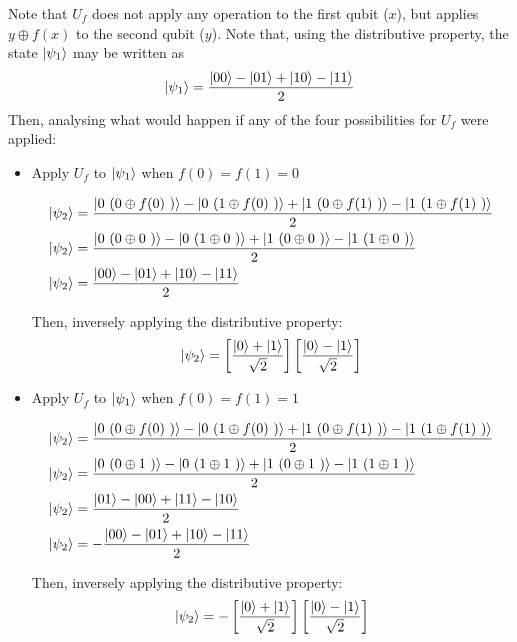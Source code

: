 Note that \(U_f\) does not apply any operation to the first qubit (\(x\)), but applies \(y \oplus f(x)\) to the second qubit (\(y\)). Note that, using the distributive property, the state \(\ket{\psi_1}\) may be written as
\[\ket{\psi_1} = \frac{\ket{00} - \ket{01} + \ket{10} - \ket{11}}{2}\]
Then, analysing what would happen if any of the four possibilities for \(U_f\) were applied:

\begin{itemize}
    \item Apply \(U_f\) to \(\ket{\psi_1}\) when \(f(0) = f(1) = 0\)
    
    \begin{align}
        \ket{\psi_2} &= \frac{\ket{0\ (0 \oplus f(0)\ )} - \ket{0\ (1 \oplus f(0)\ )} +
        \ket{1\ (0 \oplus f(1)\ )} - \ket{1\ (1 \oplus f(1)\ )}}{2}
        \\
        \ket{\psi_2} &=  \frac{\ket{0\ (0 \oplus 0\ )} - \ket{0\ (1 \oplus 0\ )} +
        \ket{1\ (0 \oplus 0\ )} - \ket{1\ (1 \oplus 0\ )}}{2}
        \\
        \ket{\psi_2} &= \frac{\ket{00} - \ket{01} + \ket{10} - \ket{11}}{2}
    \end{align}
    
    Then, inversely applying the distributive property:
    \begin{equation}
        \ket{\psi_2} =
        \left[ \frac{\ket{0} + \ket{1}}{\sqrt{2}} \right]
        \left[ \frac{\ket{0} - \ket{1}}{\sqrt{2}} \right]
    \end{equation}
        
    \item Apply \(U_f\) to \(\ket{\psi_1}\) when \(f(0) = f(1) = 1\)
    
    \begin{align}
        \ket{\psi_2} &= \frac{\ket{0\ (0 \oplus f(0)\ )} - \ket{0\ (1 \oplus f(0)\ )} +
        \ket{1\ (0 \oplus f(1)\ )} - \ket{1\ (1 \oplus f(1)\ )}}{2}
        \\
        \ket{\psi_2} &=  \frac{\ket{0\ (0 \oplus 1\ )} - \ket{0\ (1 \oplus 1\ )} +
        \ket{1\ (0 \oplus 1\ )} - \ket{1\ (1 \oplus 1\ )}}{2}
        \\
        \ket{\psi_2} &= \frac{\ket{01} - \ket{00} + \ket{11} - \ket{10}}{2}
        \\
        \ket{\psi_2} &= - \frac{\ket{00} - \ket{01} + \ket{10} - \ket{11}}{2}
    \end{align}
    
    Then, inversely applying the distributive property:
    \begin{equation}
        \ket{\psi_2} = -
        \left[ \frac{\ket{0} + \ket{1}}{\sqrt{2}} \right]
        \left[ \frac{\ket{0} - \ket{1}}{\sqrt{2}} \right]
    \end{equation}
    

\end{itemize}
